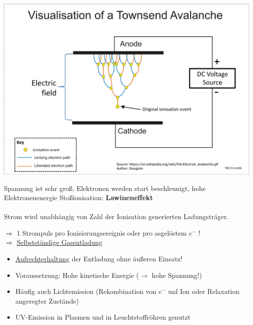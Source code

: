 \documentclass[11pt]{article}
\begin{document}
	\begin{center}
		\includegraphics[width=0.7\linewidth]{skizzen/15/VL07/7}\\
		\begin{flushleft}
			Spannung ist sehr groß, Elektronen werden start beschleunigt, hohe Elektronenenergie Stoßionisation: \textbf{Lawineneffekt}\\
			\hfill \\
			Strom wird unabhängig von Zahl der Ionisation generierten Ladungsträger. 
		\end{flushleft}
	\end{center}
	$ \Rightarrow $ 1 Strompuls pro Ionisierungsereignis oder pro asgelöstem $ e^- $ ! \\
	$ \Rightarrow $ \underline{Selbstständige Gasentladung}
	\begin{itemize}
		\item \underline{Aufrechterhaltung} der Entladung ohne äußeren Einsatz!
		\item Voraussetzung: Hohe kinetische Energie ($ \longrightarrow $ hohe Spannung!)
		\item Häufig auch Lichtemission (Rekombination von $ e^- $ unf Ion oder Relaxation angeregter Zustände)
		\item UV-Emission in Plasmen und in Leuchtstoffröhren genutzt
	\end{itemize}
				
\end{document}
